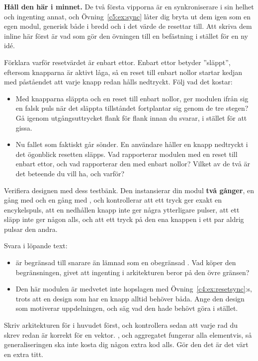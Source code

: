 \textbf{Håll den här i minnet.} De två första vipporna är en synkroniserare i sin helhet och
ingenting annat, och Övning~\ref{c5:ex:sync} låter dig bryta ut dem igen som en egen modul,
generisk både i bredd och i det värde de resettar till. Att skriva dem inline här först är vad som
gör den övningen till en befästning i stället för en ny idé.

 Förklara varför resetvärdet är enbart ettor. Enbart ettor betyder ”släppt”, eftersom
knapparna är aktivt låga, så en reset till enbart nollor startar kedjan med påståendet att varje
knapp redan hålls nedtryckt. Följ vad det kostar:
\begin{itemize}
  \item Med knapparna släppta och en reset till enbart nollor, ger modulen ifrån sig en falsk puls
    när det släppta tillståndet fortplantar sig genom de tre stegen? Gå igenom utgångsuttrycket
    flank för flank innan du svarar, i stället för att gissa.
  \item Nu fallet som faktiskt går sönder. En användare håller en knapp nedtryckt i det ögonblick
    resetten släpps. Vad rapporterar modulen med en reset till enbart ettor, och vad rapporterar
    den med enbart nollor? Vilket av de två är det beteende du vill ha, och varför?
\end{itemize}

 Verifiera designen med dess testbänk. Den instansierar din modul \textbf{två gånger}, en
gång med  och en gång med , och kontrollerar att ett tryck ger
exakt en encykelspuls, att en nedhållen knapp inte ger några ytterligare pulser, att ett släpp inte
ger någon alls, och att ett tryck på den ena knappen i ett par aldrig pulsar den andra.

 Svara i löpande text:
\begin{itemize}
  \item {} är begränsad till  snarare än lämnad som en obegränsad
    . Vad köper den begränsningen, givet att ingenting i arkitekturen beror på den
    övre gränsen?
  \item Den här modulen är medvetet inte hopslagen med Övning~\ref{c4:ex:resetsync}:s, trots att en
    design som har en knapp alltid behöver båda. Ange den design som motiverar uppdelningen, och
    säg vad den hade behövt göra i stället.
\end{itemize}

\note[Tips]Skriv arkitekturen för  i huvudet först, och kontrollera sedan att varje
rad du skrev redan är korrekt för en vektor. ,  och aggregatet
 fungerar alla elementvis, så generaliseringen ska inte kosta dig någon extra
kod alls. Gör den det är det värt en extra titt.

